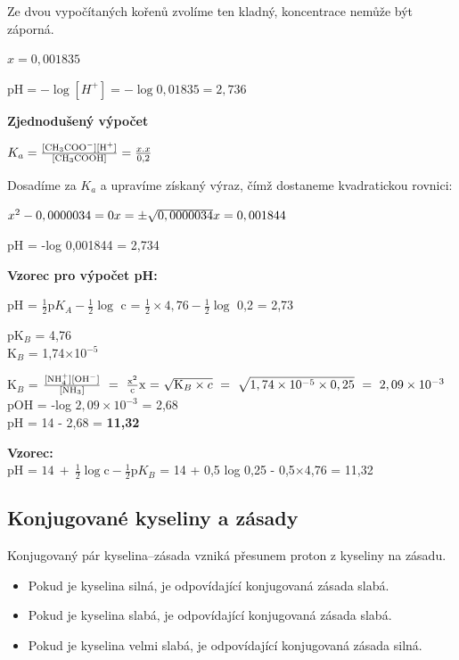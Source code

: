 Ze dvou vypočítaných kořenů zvolíme ten kladný, koncentrace nemůže být záporná.

$x = 0,001835$

$\textrm{pH} = -\log[H^+] = -\log0,01835 = 2,736$

\newpage

\textbf{Zjednodušený výpočet}

$K_a = \frac{[\ce{CH3COO^-}][\ce{H^+}]}{[\ce{CH3COOH}]} = \frac{x.x}{0,2}$

Dosadíme za $K_a$ a upravíme získaný výraz, čímž dostaneme kvadratickou rovnici:

$x^2 - 0,0000034 = 0\\
x = \pm\sqrt{0,0000034}\\
x = 0,001844$

pH = -log 0,001844 = 2,734

\textbf{Vzorec pro výpočet pH:}

pH = $\frac{1}{2}\textrm{p}K_A-\frac{1}{2}\log$ c = $\frac{1}{2}\times4,76 -\frac{1}{2}\log$ 0,2 = 2,73



pK$_B$ = 4,76\\
K$_B$ = 1,74$\times$10$^{-5}$

K$_B$ = $\frac{[\ce{NH$^+_4$}][\ce{OH-}]}{[\ce{NH3}]}\ =\ \frac{\ce{x^2}}{\ce{c}}\\
\textrm{x = }\sqrt{\textrm{K}_B\times c}\ =\ \sqrt{1,74\times10^{-5}\times 0,25}\ =\ 2,09\times10^{-3}$\\
pOH = -log $2,09\times10^{-3}$ = 2,68\\
pH = 14 - 2,68 = \textbf{11,32}

\textbf{Vzorec:}\\
pH = $14\ +\ \frac{1}{2}\log\textrm{c} - \frac{1}{2}\textrm{p}K_B$ = 14 + 0,5 log 0,25 - 0,5$\times$4,76 = 11,32

\subsection{Konjugované kyseliny a zásady}
Konjugovaný pár kyselina--zásada vzniká přesunem proton z kyseliny na zásadu.


\begin{itemize}
	\item Pokud je kyselina silná, je odpovídající konjugovaná zásada slabá.
	\item Pokud je kyselina slabá, je odpovídající konjugovaná zásada slabá.
	\item Pokud je kyselina velmi slabá, je odpovídající konjugovaná zásada silná.
\end{itemize}

